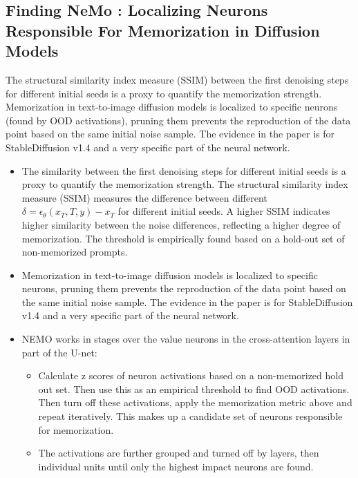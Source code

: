 \documentclass{article}
\begin{document}
\subsection{Finding NeMo : Localizing Neurons Responsible For Memorization in Diffusion Models}
\begin{tldr}
    The structural similarity index measure (SSIM) between the first denoising steps for different initial seeds is a proxy to quantify the memorization strength. Memorization in text-to-image diffusion models is localized to specific neurons (found by OOD activations), pruning them prevents the reproduction of the data point based on the same initial noise sample. The evidence in the paper is for StableDiffusion v1.4 and a very specific part of the neural network.
\end{tldr}
\begin{itemize}
    \item The similarity between the first denoising steps for different initial seeds is a proxy to quantify the memorization strength. The structural similarity index measure (SSIM) measures the difference between different $\delta=\epsilon_\theta\left(x_T, T, y\right)-x_T$ for different initial seeds. A higher SSIM indicates higher similarity between the noise differences, reflecting a higher degree of memorization. The threshold is empirically found based on a hold-out set of non-memorized prompts.
    \item Memorization in text-to-image diffusion models is localized to specific neurons, pruning them prevents the reproduction of the data point based on the same initial noise sample. The evidence in the paper is for StableDiffusion v1.4 and a very specific part of the neural network.
    \item NEMO works in stages over the value neurons in the cross-attention layers in part of the U-net:
    \begin{itemize}
        \item[1] Calculate z scores of neuron activations based on a non-memorized hold out set. Then use this as an empirical threshold to find OOD activations. Then turn off these activations, apply the memorization metric above and repeat iteratively. This makes up a candidate set of neurons responsible for memorization.
        \item[2] The activations are further grouped and turned off by layers, then individual units until only the highest impact neurons are found.
    \end{itemize}
\end{itemize}
\end{document}
